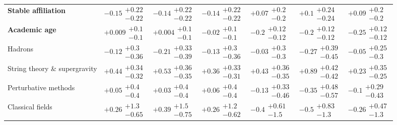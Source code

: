 \begin{table}[H]
\begin{tabular}{lllllll}
\textbf{Stable affiliation} & $-0.15\substack{+0.22 \\ -0.22}$ & $-0.14\substack{+0.22 \\ -0.22}$ & $-0.14\substack{+0.22 \\ -0.22}$ & $+0.07\substack{+0.2 \\ -0.2}$ & $+0.1\substack{+0.24 \\ -0.24}$ & $+0.09\substack{+0.2 \\ -0.2}$ \\
\textbf{Academic age} & $+0.009\substack{+0.1 \\ -0.1}$ & $+0.004\substack{+0.1 \\ -0.1}$ & $-0.02\substack{+0.1 \\ -0.1}$ & $\bm{-0.2}\substack{+0.12 \\ -0.12}$ & $\bm{-0.2}\substack{+0.12 \\ -0.12}$ & $\bm{-0.25}\substack{+0.12 \\ -0.12}$ \\
\hline Hadrons & $-0.12\substack{+0.3 \\ -0.36}$ & $-0.21\substack{+0.33 \\ -0.39}$ & $-0.13\substack{+0.3 \\ -0.36}$ & $-0.03\substack{+0.3 \\ -0.3}$ & $-0.27\substack{+0.39 \\ -0.45}$ & $-0.05\substack{+0.25 \\ -0.3}$ \\
String theory \& supergravity & $\bm{+0.44}\substack{+0.34 \\ -0.32}$ & $\bm{+0.53}\substack{+0.36 \\ -0.35}$ & $\bm{+0.36}\substack{+0.33 \\ -0.31}$ & $\bm{+0.43}\substack{+0.36 \\ -0.35}$ & $\bm{+0.89}\substack{+0.42 \\ -0.42}$ & $+0.23\substack{+0.35 \\ -0.25}$ \\
Perturbative methods & $+0.05\substack{+0.4 \\ -0.4}$ & $+0.03\substack{+0.4 \\ -0.4}$ & $+0.06\substack{+0.4 \\ -0.4}$ & $-0.13\substack{+0.33 \\ -0.46}$ & $-0.35\substack{+0.48 \\ -0.57}$ & $-0.1\substack{+0.29 \\ -0.43}$ \\
Classical fields & $+0.26\substack{+1.3 \\ -0.65}$ & $+0.39\substack{+1.5 \\ -0.75}$ & $+0.26\substack{+1.2 \\ -0.62}$ & $-0.4\substack{+0.61 \\ -1.5}$ & $-0.5\substack{+0.83 \\ -1.3}$ & $-0.26\substack{+0.47 \\ -1.3}$ \\

\end{tabular}
\end{table}
